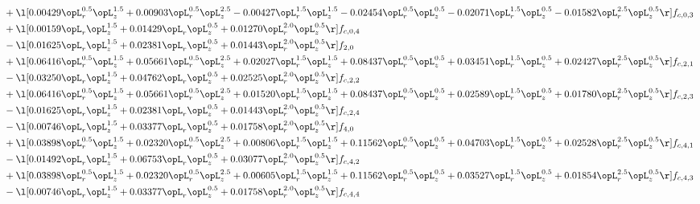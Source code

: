 \begin{alignat}{2}
& + \l[  0.00429 \opL_r^{0.5} \opL_z^{1.5} +  0.00903 \opL_r^{0.5} \opL_z^{2.5}   -0.00427 \opL_r^{1.5} \opL_z^{1.5}   -0.02454 \opL_r^{0.5} \opL_z^{0.5}   -0.02071 \opL_r^{1.5} \opL_z^{0.5}   -0.01582 \opL_r^{2.5} \opL_z^{0.5}  \r] f_{c,0,3} \nonumber \\ 
& + \l[  0.00159 \opL_r \opL_z^{1.5} +  0.01429 \opL_r \opL_z^{0.5} +  0.01270 \opL_r^{2.0} \opL_z^{0.5}  \r] f_{c,0,4} \nonumber \\ 
& - \l[  0.01625 \opL_r \opL_z^{1.5} +  0.02381 \opL_r \opL_z^{0.5} +  0.01443 \opL_r^{2.0} \opL_z^{0.5}  \r] f_{2,0} \nonumber \\ 
& + \l[  0.06416 \opL_r^{0.5} \opL_z^{1.5} +  0.05661 \opL_r^{0.5} \opL_z^{2.5} +  0.02027 \opL_r^{1.5} \opL_z^{1.5} +  0.08437 \opL_r^{0.5} \opL_z^{0.5} +  0.03451 \opL_r^{1.5} \opL_z^{0.5} +  0.02427 \opL_r^{2.5} \opL_z^{0.5}  \r] f_{c,2,1} \nonumber \\ 
& - \l[  0.03250 \opL_r \opL_z^{1.5} +  0.04762 \opL_r \opL_z^{0.5} +  0.02525 \opL_r^{2.0} \opL_z^{0.5}  \r] f_{c,2,2} \nonumber \\ 
& + \l[  0.06416 \opL_r^{0.5} \opL_z^{1.5} +  0.05661 \opL_r^{0.5} \opL_z^{2.5} +  0.01520 \opL_r^{1.5} \opL_z^{1.5} +  0.08437 \opL_r^{0.5} \opL_z^{0.5} +  0.02589 \opL_r^{1.5} \opL_z^{0.5} +  0.01780 \opL_r^{2.5} \opL_z^{0.5}  \r] f_{c,2,3} \nonumber \\ 
& - \l[  0.01625 \opL_r \opL_z^{1.5} +  0.02381 \opL_r \opL_z^{0.5} +  0.01443 \opL_r^{2.0} \opL_z^{0.5}  \r] f_{c,2,4} \nonumber \\ 
& - \l[  0.00746 \opL_r \opL_z^{1.5} +  0.03377 \opL_r \opL_z^{0.5} +  0.01758 \opL_r^{2.0} \opL_z^{0.5}  \r] f_{4,0} \nonumber \\ 
& + \l[  0.03898 \opL_r^{0.5} \opL_z^{1.5} +  0.02320 \opL_r^{0.5} \opL_z^{2.5} +  0.00806 \opL_r^{1.5} \opL_z^{1.5} +  0.11562 \opL_r^{0.5} \opL_z^{0.5} +  0.04703 \opL_r^{1.5} \opL_z^{0.5} +  0.02528 \opL_r^{2.5} \opL_z^{0.5}  \r] f_{c,4,1} \nonumber \\ 
& - \l[  0.01492 \opL_r \opL_z^{1.5} +  0.06753 \opL_r \opL_z^{0.5} +  0.03077 \opL_r^{2.0} \opL_z^{0.5}  \r] f_{c,4,2} \nonumber \\ 
& + \l[  0.03898 \opL_r^{0.5} \opL_z^{1.5} +  0.02320 \opL_r^{0.5} \opL_z^{2.5} +  0.00605 \opL_r^{1.5} \opL_z^{1.5} +  0.11562 \opL_r^{0.5} \opL_z^{0.5} +  0.03527 \opL_r^{1.5} \opL_z^{0.5} +  0.01854 \opL_r^{2.5} \opL_z^{0.5}  \r] f_{c,4,3} \nonumber \\ 
& - \l[  0.00746 \opL_r \opL_z^{1.5} +  0.03377 \opL_r \opL_z^{0.5} +  0.01758 \opL_r^{2.0} \opL_z^{0.5}  \r] f_{c,4,4} \nonumber \\ 
\end{alignat} 


